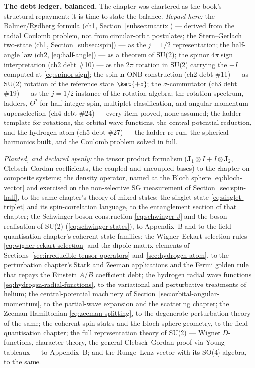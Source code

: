 \medskip\noindent\textbf{The debt ledger, balanced.} The chapter was chartered as the book's structural repayment; it is time to state the balance. \emph{Repaid here:} the Balmer/Rydberg formula (ch1, Section~\ref{subsec:matrix}) --- derived from the radial Coulomb problem, not from circular-orbit postulates; the Stern--Gerlach two-state (ch1, Section~\ref{subsec:spin}) --- as the $j=1/2$ representation; the half-angle law (ch2, \eqref{eq:half-angle}) --- as a theorem of SU(2); the spinor $4\pi$ sign interpretation (ch2 debt \#10) --- as the $2\pi$ rotation in SU(2) carrying the $-I$ computed at \eqref{eq:spinor-sign}; the spin-$\bm n$ ONB construction (ch2 debt \#11) --- as SU(2) rotation of the reference state $\ket{+z}$; the $\sigma$-commutator (ch3 debt \#19) --- as the $j=1/2$ instance of the rotation algebra; the rotation spectrum, ladders, $\Theta^2$ for half-integer spin, multiplet classification, and angular-momentum superselection (ch4 debt \#24) --- every item proved, none assumed; the ladder template for rotations, the orbital wave functions, the central-potential reduction, and the hydrogen atom (ch5 debt \#27) --- the ladder re-run, the spherical harmonics built, and the Coulomb problem solved in full.

\emph{Planted, and declared openly:} the tensor product formalism ($\bm J_1\otimes I + I\otimes\bm J_2$, Clebsch--Gordan coefficients, the coupled and uncoupled bases) to the chapter on composite systems; the density operator, named at the Bloch sphere \eqref{eq:bloch-vector} and exercised on the non-selective SG measurement of Section~\ref{sec:spin-half}, to the same chapter's theory of mixed states; the singlet state \eqref{eq:singlet-triplet} and its spin-correlation language, to the entanglement section of that chapter; the Schwinger boson construction \eqref{eq:schwinger-J} and the boson realisation of SU(2) (\eqref{eq:schwinger-states}), to Appendix~B and to the field-quantisation chapter's coherent-state families; the Wigner--Eckart selection rules \eqref{eq:wigner-eckart-selection} and the dipole matrix elements of Sections~\ref{sec:irreducible-tensor-operators} and~\ref{sec:hydrogen-atom}, to the perturbation chapter's Stark and Zeeman applications and the Fermi golden rule that repays the Einstein $A$/$B$ coefficient debt; the hydrogen radial wave functions \eqref{eq:hydrogen-radial-functions}, to the variational and perturbative treatments of helium; the central-potential machinery of Section~\ref{sec:orbital-angular-momentum}, to the partial-wave expansion and the scattering chapter; the Zeeman Hamiltonian \eqref{eq:zeeman-splitting}, to the degenerate perturbation theory of the same; the coherent spin states and the Bloch sphere geometry, to the field-quantisation chapter; the full representation theory of SU(2) --- Wigner $D$-functions, character theory, the general Clebsch--Gordan proof via Young tableaux --- to Appendix~B; and the Runge--Lenz vector with its SO(4) algebra, to the same.

